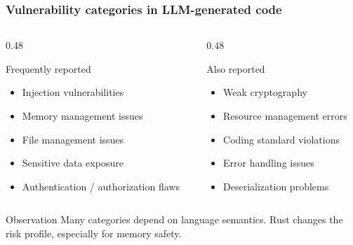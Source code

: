 

\begin{frame}
\frametitle{Vulnerability categories in LLM-generated code}

\begin{columns}[T]
\begin{column}{0.48\textwidth}
\begin{block}{Frequently reported}
\begin{itemize}
    \item Injection vulnerabilities
    \item Memory management issues
    \item File management issues
    \item Sensitive data exposure
    \item Authentication / authorization flaws
\end{itemize}
\end{block}
\end{column}

\begin{column}{0.48\textwidth}
\begin{block}{Also reported}
\begin{itemize}
    \item Weak cryptography
    \item Resource management errors
    \item Coding standard violations
    \item Error handling issues
    \item Deserialization problems
\end{itemize}
\end{block}
\end{column}
\end{columns}

\bigskip

\begin{alertblock}{Observation}
Many categories depend on language semantics. Rust changes the risk profile, especially for memory safety.
\end{alertblock}

\end{frame}


